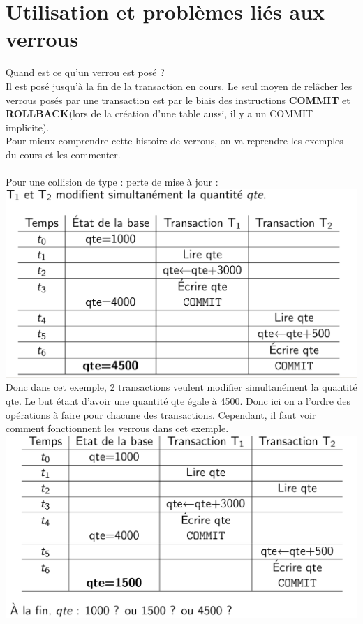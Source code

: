 \documentclass{report}
\begin{document}
\section{Utilisation et problèmes liés aux verrous}
Quand est ce qu'un verrou est posé ?\\
Il est posé jusqu'à la fin de la transaction en cours. Le seul moyen de relâcher les verrous posés par une transaction est par le biais des instructions \textbf{COMMIT} et \textbf{ROLLBACK}(lors de la création d'une table aussi, il y a un COMMIT implicite).\\
Pour mieux comprendre cette histoire de verrous, on va reprendre les exemples du cours et les commenter.\\\\
Pour une collision de type : perte de mise à jour :\\
\includegraphics[scale=0.3]{./Pictures/BD1.PNG}\\
Donc dans cet exemple, 2 transactions veulent modifier simultanément la quantité qte. Le but étant d'avoir une quantité qte égale à 4500. Donc ici on a l'ordre des opérations à faire pour chacune des transactions. Cependant, il faut voir comment fonctionnent les verrous dans cet exemple.\\
\includegraphics[scale=0.3]{./Pictures/BD2.PNG}\\
\end{document}
